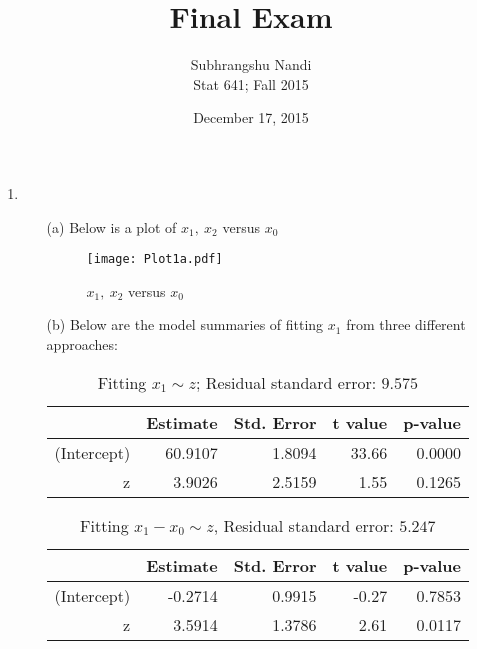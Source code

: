 \documentclass[11pt,a4paper]{article}
\begin{document}
\title{Final Exam}
\author{Subhrangshu Nandi\\
  Stat 641; Fall 2015}
\date{December 17, 2015}

\maketitle

\begin{enumerate}
\item 
\begin{enumerate}
\item[(a)] Below is a plot of $x_1,\ x_2$ versus $x_0$
\begin{figure}[H]
\begin{center}
\texttt{[image: Plot1a.pdf]}
\end{center}
\caption{$x_1,\ x_2$ versus $x_0$}
\label{fig:Fig1a}
\end{figure}

\item[(b)] Below are the model summaries of fitting $x_1$ from three different approaches:
\begin{table}[H]
\centering
\begin{tabular}{rrrrr}
  \hline
 & Estimate & Std. Error & t value & p-value \\ 
  \hline
(Intercept) & 60.9107 & 1.8094 & 33.66 & 0.0000 \\ 
  z & 3.9026 & 2.5159 & 1.55 & 0.1265 \\ 
   \hline
\end{tabular}
\caption{Fitting $x_1 \sim z$; Residual standard error: $9.575$}
\end{table}

\begin{table}[H]
\centering
\begin{tabular}{rrrrr}
  \hline
 & Estimate & Std. Error & t value & p-value \\ 
  \hline
(Intercept) & -0.2714 & 0.9915 & -0.27 & 0.7853 \\ 
  z & 3.5914 & 1.3786 & 2.61 & 0.0117 \\ 
   \hline
\end{tabular}
\caption{Fitting $x_1 - x_0 \sim z$, Residual standard error: $5.247$}
\end{table}


\end{enumerate}
\end{enumerate}
\end{document}
